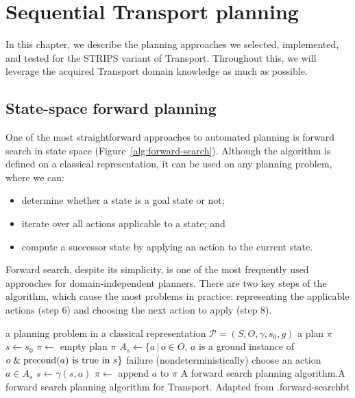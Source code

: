 \chapter{Sequential Transport planning}

In this chapter, we describe the planning approaches we
selected, implemented, and tested for the STRIPS variant of Transport.
Throughout this, we will leverage the acquired
Transport domain knowledge as much as possible.

\section{State-space forward planning}\label{forward-planning}

One of the most straightforward approaches to automated planning
is forward search \citep[Section~4.2]{Ghallab2004}
in state space (Figure~\ref{alg:forward-search}).
Although the algorithm is defined on a classical representation,
it can be used on any planning problem, where we can:
\begin{itemize}
\item determine whether a state is a goal state or not;
\item iterate over all actions applicable to a state; and
\item compute a successor state by applying an action to the current state.
\end{itemize}
Forward search, despite its simplicity, is one of the most frequently
used approaches for domain-independent planners.
There are two key steps of the algorithm, which
cause the most problems in practice: representing
the applicable actions (step 6) and choosing the
next action to apply (step 8).

%
{%
\Input a planning problem in a classical representation $\mathcal{P} = (S, O, \gamma, s_0, g)$
\Output a plan $\pi$
\State $s \gets s_0$
\State $\pi \gets $ empty plan
\Loop
{} \Return $\pi$ \EndIf
\State $A_s \gets \{a \,|\, o \in O$, $a$ is a ground instance of $o \;\&\; \textrm{precond}(a) \textrm{ is true in } s\}$
 \Return failure \EndIf
\State (nondeterministically) choose an action $a \in A_s$
\State $s \gets \gamma(s, a)$
\State $\pi \gets$ append $a$ to $\pi$
\EndLoop
\EndFunction
}%
{A forward search planning algorithm.}{A forward search planning algorithm for Transport. Adapted from \citet[Figure~4.1]{Ghallab2004}.}{forward-search}{bt}

